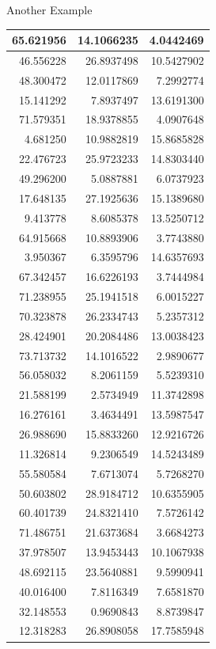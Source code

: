 \documentclass[
  ignorenonframetext,
]{beamer}
\begin{document}
\begin{frame}{Another Example}
\begin{table}
\begin{tabular}[t]{r|r|r}
\hline
65.621956 & 14.1066235 & 4.0442469\\
\hline
46.556228 & 26.8937498 & 10.5427902\\
\hline
48.300472 & 12.0117869 & 7.2992774\\
\hline
15.141292 & 7.8937497 & 13.6191300\\
\hline
71.579351 & 18.9378855 & 4.0907648\\
\hline
4.681250 & 10.9882819 & 15.8685828\\
\hline
22.476723 & 25.9723233 & 14.8303440\\
\hline
49.296200 & 5.0887881 & 6.0737923\\
\hline
17.648135 & 27.1925636 & 15.1389680\\
\hline
9.413778 & 8.6085378 & 13.5250712\\
\hline
64.915668 & 10.8893906 & 3.7743880\\
\hline
3.950367 & 6.3595796 & 14.6357693\\
\hline
67.342457 & 16.6226193 & 3.7444984\\
\hline
71.238955 & 25.1941518 & 6.0015227\\
\hline
70.323878 & 26.2334743 & 5.2357312\\
\hline
28.424901 & 20.2084486 & 13.0038423\\
\hline
73.713732 & 14.1016522 & 2.9890677\\
\hline
56.058032 & 8.2061159 & 5.5239310\\
\hline
21.588199 & 2.5734949 & 11.3742898\\
\hline
16.276161 & 3.4634491 & 13.5987547\\
\hline
26.988690 & 15.8833260 & 12.9216726\\
\hline
11.326814 & 9.2306549 & 14.5243489\\
\hline
55.580584 & 7.6713074 & 5.7268270\\
\hline
50.603802 & 28.9184712 & 10.6355905\\
\hline
60.401739 & 24.8321410 & 7.5726142\\
\hline
71.486751 & 21.6373684 & 3.6684273\\
\hline
37.978507 & 13.9453443 & 10.1067938\\
\hline
48.692115 & 23.5640881 & 9.5990941\\
\hline
40.016400 & 7.8116349 & 7.6581870\\
\hline
32.148553 & 0.9690843 & 8.8739847\\
\hline
12.318283 & 26.8908058 & 17.7585948\\

\end{tabular}
\end{table}
\end{frame}
\end{document}
